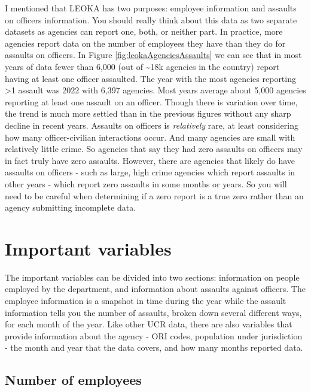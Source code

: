 \documentclass[
]{krantz}
\begin{document}
I mentioned that LEOKA has two purposes: employee
information and assaults on officers information. You should
really think about this data as two separate datasets as
agencies can report one, both, or neither part. In practice,
more agencies report data on the number of employees they
have than they do for assaults on officers. In Figure
\ref{fig:leokaAgenciesAssaults} we can see that in most
years of data fewer than 6,000 (out of \textasciitilde18k
agencies in the country) report having at least one officer
assaulted. The year with the most agencies reporting
\textgreater1 assault was 2022 with 6,397 agencies. Most
years average about 5,000 agencies reporting at least one
assault on an officer. Though there is variation over time,
the trend is much more settled than in the previous figures
without any sharp decline in recent years. Assaults on
officers is \emph{relatively} rare, at least considering how
many officer-civilian interactions occur. And many agencies
are small with relatively little crime. So agencies that say
they had zero assaults on officers may in fact truly have
zero assaults. However, there are agencies that likely do
have assaults on officers - such as large, high crime
agencies which report assaults in other years - which report
zero assaults in some months or years. So you will need to
be careful when determining if a zero report is a true zero
rather than an agency submitting incomplete data.

\section{Important variables}\label{important-variables-4}

The important variables can be divided into two sections:
information on people employed by the department, and
information about assaults against officers. The employee
information is a snapshot in time during the year while the
assault information tells you the number of assaults, broken
down several different ways, for each month of the year.
Like other UCR data, there are also variables that provide
information about the agency - ORI codes, population under
jurisdiction - the month and year that the data covers, and
how many months reported data.

\subsection{Number of employees}\label{number-of-employees}
\end{document}
